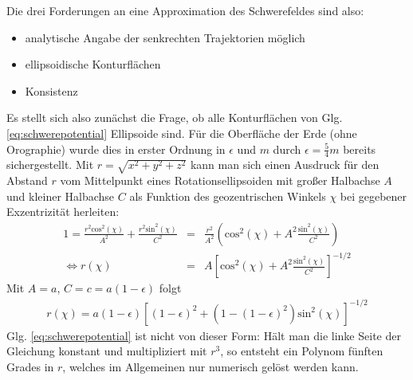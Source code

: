 \documentclass{book}
\renewcommand{\sin}{\text{sin}}
\renewcommand{\cos}{\text{cos}}
\begin{document}
Die drei Forderungen an eine Approximation des Schwerefeldes sind also:
%
\begin{itemize}
\item analytische Angabe der senkrechten Trajektorien möglich
\item ellipsoidische Konturflächen
\item Konsistenz
\end{itemize}
%
Es stellt sich also zunächst die Frage, ob alle Konturflächen von Glg. \eqref{eq:schwerepotential} Ellipsoide sind. Für die Oberfläche der Erde (ohne Orographie) wurde dies in erster Ordnung in $\epsilon$ und $m$ durch $\epsilon = \frac{5}{4}m$ bereits sichergestellt. Mit $r = \sqrt{x^2 + y^2 + z^2}$ kann man sich einen Ausdruck für den Abstand $r$ vom Mittelpunkt eines Rotationsellipsoiden mit großer Halbachse $A$ und kleiner Halbachse $C$ als Funktion des geozentrischen Winkels $\chi$ bei gegebener Exzentrizität herleiten:
%
\begin{eqnarray}
1 = \frac{r^2\cos^2\left(\chi\right)}{A^2} + \frac{r^2\sin^2\left(\chi\right)}{C^2} & = & \frac{r^2}{A^2}\left(\cos^2\left(\chi\right) + A^2\frac{\sin^2\left(\chi\right)}{C^2}\right)\nonumber\\
\Leftrightarrow r\left(\chi\right) & = & A\left[\cos^2\left(\chi\right) + A^2\frac{\sin^2\left(\chi\right)}{C^2}\right]^{-1/2}\label{eq:defellipse_1}
\end{eqnarray}
%
Mit $A = a$, $C = c = a\left(1 - \epsilon\right)$ folgt
%
\begin{eqnarray}
r\left(\chi\right) = a\left(1 - \epsilon\right)\left[\left(1 - \epsilon\right)^2 + \left(1 - \left(1 - \epsilon\right)^2\right)\sin^2\left(\chi\right)\right]^{-1/2}\label{eq:defellipse_2}
\end{eqnarray}
%
Glg. \eqref{eq:schwerepotential} ist nicht von dieser Form: Hält man die linke Seite der Gleichung konstant und multipliziert mit $r^3$, so entsteht ein Polynom fünften Grades in $r$, welches im Allgemeinen nur numerisch gelöst werden kann.
\end{document}

